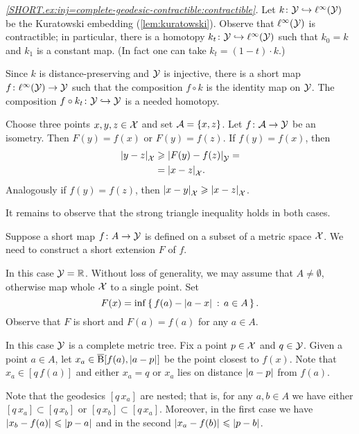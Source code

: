 \textit{\ref{SHORT.ex:inj=complete-geodesic-contractible:contractible}.}
Let $k\colon\mathcal{Y}\hookrightarrow \ell^\infty(\mathcal{Y})$ be the Kuratowski embedding (\ref{lem:kuratowski}).
Observe that $\ell^\infty(\mathcal{Y})$ is contractible;
in particular, there is a homotopy $k_t\colon\mathcal{Y}\hookrightarrow \ell^\infty(\mathcal{Y})$ such that $k_0=k$ and $k_1$ is a constant map.
(In fact one can take $k_t=(1-t)\cdot k$.)

Since $k$ is distance-preserving and $\mathcal{Y}$ is injective,
there is a short map $f\colon\ell^\infty(\mathcal{Y})\to \mathcal{Y}$ such that the composition $f\circ k$ is the identity map on $\mathcal{Y}$.
The composition $f\circ k_t\colon\mathcal{Y}\hookrightarrow \mathcal{Y}$ is a needed homotopy. 

Choose three points $x,y,z\in\mathcal{X}$ and set $\mathcal{A}=\{x,z\}$.
Let $f\colon\mathcal{A}\to \mathcal{Y}$ be an isometry.
Then $F(y)=f(x)$ or $F(y)=f(z)$.
If  $f(y)=f(x)$, then
\begin{align*}
\dist{y}{z}{\spc{X}}&\ge  \dist{F(y)}{f(z)}{\spc{Y}}=
\\
 &=\dist{x}{z}{\spc{X}}.
\end{align*}
Analogously if $f(y)=f(z)$, then $\dist{x}{y}{\spc{X}}\ge\dist{x}{z}{\spc{X}}$.

It remains to observe that the strong triangle inequality holds in both cases.

Suppose a short map $f\colon A\to\mathcal{Y}$ is defined on a subset of a metric space $\mathcal{X}$.
We need to construct a short extension $F$ of $f$.

In this case $\mathcal{Y}=\mathbb{R}$.
Without loss of generality, we may assume that $A\ne\emptyset$, otherwise map whole $\mathcal{X}$ to a single point.
Set 
\[F(x)=\inf\set{f(a)-\dist{a}{x}{}}{a\in A}.\] 
Observe that $F$ is short and $F(a)=f(a)$ for any $a\in A$.

In this case $\mathcal{Y}$ is a complete metric tree.
Fix a point $p\in \mathcal{X}$ and $q\in\mathcal{Y}$.
Given a point $a\in A$,
let $x_a\in\cBall[f(a),\dist{a}{p}{}]$ be the point closest to $f(x)$.
Note that $x_a\in[q\,f(a)]$ and either $x_a=q$ or $x_a$ lies on distance $\dist{a}{p}{}$ from $f(a)$.

Note that the geodesics $[q\,x_a]$ are nested;
that is, for any $a,b\in A$ we have either $[q\,x_a]\subset [q\,x_b]$ or $[q\,x_b]\subset [q\,x_a]$.
Moreover, in the first case we have $\dist{x_b}{f(a)}{}\le \dist{p}{a}{}$ and in the second $\dist{x_a}{f(b)}{}\le \dist{p}{b}{}$.


